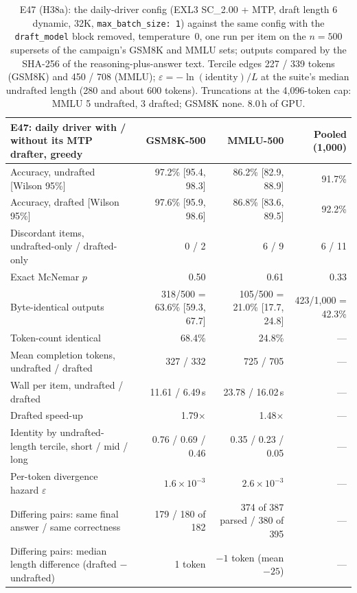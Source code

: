 \documentclass[11pt]{article}
\newcommand{\q}[1]{\texttt{#1}}
\begin{document}
\begin{table}[htbp]
\centering
\scriptsize
\setlength{\tabcolsep}{4pt}
\begin{tabular}{L{4.9cm}rrr}
\toprule
E47: daily driver with / without its MTP drafter, greedy & GSM8K-500 & MMLU-500 & Pooled (1,000) \\
\midrule
Accuracy, undrafted [Wilson 95\%] & 97.2\% [95.4, 98.3] & 86.2\% [82.9, 88.9] & 91.7\% \\
Accuracy, drafted [Wilson 95\%] & 97.6\% [95.9, 98.6] & 86.8\% [83.6, 89.5] & 92.2\% \\
Discordant items, undrafted-only / drafted-only & 0 / 2 & 6 / 9 & 6 / 11 \\
Exact McNemar $p$ & 0.50 & 0.61 & 0.33 \\
Byte-identical outputs & 318/500 = 63.6\% [59.3, 67.7] & 105/500 = 21.0\% [17.7, 24.8] & 423/1,000 = 42.3\% \\
Token-count identical & 68.4\% & 24.8\% & --- \\
Mean completion tokens, undrafted / drafted & 327 / 332 & 725 / 705 & --- \\
Wall per item, undrafted / drafted & 11.61 / 6.49\,s & 23.78 / 16.02\,s & --- \\
Drafted speed-up & 1.79$\times$ & 1.48$\times$ & --- \\
Identity by undrafted-length tercile, short / mid / long & 0.76 / 0.69 / 0.46 & 0.35 / 0.23 / 0.05 & --- \\
Per-token divergence hazard $\varepsilon$ & $1.6\times10^{-3}$ & $2.6\times10^{-3}$ & --- \\
Differing pairs: same final answer / same correctness & 179 / 180 of 182 & 374 of 387 parsed / 380 of 395 & --- \\
Differing pairs: median length difference (drafted $-$ undrafted) & 1 token & $-1$ token (mean $-25$) & --- \\
\bottomrule
\end{tabular}
\caption{E47 (H38a): the daily-driver config (EXL3 SC\_2.00 + MTP, draft
length 6 dynamic, 32K, \q{max\_batch\_size: 1}) against the same config with
the \q{draft\_model} block removed, temperature~0, one run per item on the
$n=500$ supersets of the campaign's GSM8K and MMLU sets; outputs compared by
the SHA-256 of the reasoning-plus-answer text. Tercile edges 227 / 339 tokens
(GSM8K) and 450 / 708 (MMLU); $\varepsilon=-\ln(\text{identity})/L$ at the
suite's median undrafted length (280 and about 600 tokens). Truncations at
the 4,096-token cap: MMLU 5 undrafted, 3 drafted; GSM8K none. 8.0\,h of
GPU.}
\label{tab:h38a}
\end{table}
\end{document}
